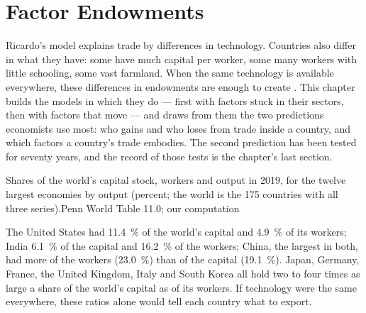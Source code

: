 \chapter{Factor Endowments}\label{ch:b3:factor-endowments}

Ricardo's model explains trade by differences in technology. Countries also
differ in what they have: some have much capital per worker, some many workers
with little schooling, some vast farmland. When the same technology is available
everywhere, these differences in endowments are enough to create . This chapter builds the models in which they do --- first with
factors stuck in their sectors, then with factors that move --- and draws from
them the two predictions economists use most: who gains and who loses from
trade inside a country, and which factors a country's trade embodies. The second
prediction has been tested for seventy years, and the record of those tests is
the chapter's last section.

\begin{openingchart}{Shares of the world's capital stock, workers and output in
2019, for the twelve largest economies by output (percent; the world is the 175
countries with all three series).}{Penn World Table 11.0; our computation}
\end{openingchart}

The United States had 11.4~\% of the world's capital and 4.9~\% of its workers;
India 6.1~\% of the capital and 16.2~\% of the workers; China, the largest in
both, had more of the workers (23.0~\%) than of the capital (19.1~\%).
Japan, Germany, France, the United Kingdom, Italy and South Korea all hold two to
four times as large a share of the world's capital as of its workers. If
technology were the same everywhere, these ratios alone would tell each country
what to export.

